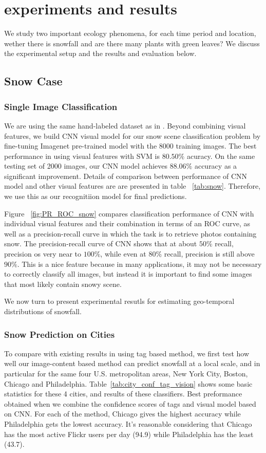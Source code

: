 \section{experiments and results}
We study two important ecology phenomena, for each time period and location, 
wether there is snowfall and are there many plants with green leaves? We discuss the experimental setup 
and the results and evaluation below.
\subsection{Snow Case}
\subsubsection{Single Image Classification}
We are using the same hand-labeled dataset as in .
Beyond combining visual features, 
we build CNN visual model for our snow scene classification problem 
by fine-tuning Imagenet pre-trained model with the 8000 training images. The best 
performance in  using visual features with SVM is $80.50\%$ acuracy.
On the same testing set of 2000 images, our CNN model achieves $88.06\%$ accuracy as a significant 
improvement. Details of comparison between performance of CNN model
 and other visual features are  are presented in table ~\ref{tab:snow}. Therefore, we use this as our recognitiion model for final predictions.

Figure ~\ref{fig:PR_ROC_snow} compares classification performance of CNN with 
individual visual features and their combination in terms of an ROC curve, 
as well as a precision-recall curve in which the task is to retrieve photos containing snow.
The precision-recall curve of CNN shows that at about $50\%$ recall, precision os very near to $100\%$, 
while even at $80\%$ recall, precision is still above $90\%$. This is a nice feature because 
in many applications, it may not be necessary to correctly 
classify all images, but instead it is important to find some images that most likely contain snowy 
scene.

We now turn to present experimental resutls for estimating geo-temporal distributions of snowfall.

\subsubsection{Snow Prediction on Cities}
To compare with existing results in  using tag based method,
we first test how well our image-content based method can predict snowfall at a local scale, 
and in particular 
for the same four U.S. metropolitan areas, New York City, Boston, Chicago and Philadelphia. 
Table~\ref{tab:city_conf_tag_vision} 
shows some basic statistics for these 4 cities, and results of these classifiers. 
Best preformance obtained when we combine 
the confidence scores of tags and visual model based on CNN. For each of the method, 
Chicago gives the highest accuracy while Philadelphia gets the lowest accuracy. 
It's reasonable considering that Chicago has the most active Flickr users per
day (94.9) while Philadelphia has the least (43.7). 

